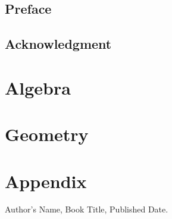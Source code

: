 \documentclass[12pt,a4paper,purple]{colorbook}
\begin{document}
	\frontmatter
	\tableofcontents
	\chapter{Preface}
	\chapter{Acknowledgment}
	\mainmatter
	\part{Algebra}
	\blinddocument
	\blinddocument
	\part{Geometry}
	\blinddocument
	\blinddocument
	\appendix
	\part{Appendix}
	\blinddocument
	\backmatter
	\begin{thebibliography}{9}
		 Author's Name, Book Title, Published Date.
	\end{thebibliography}
\end{document}
